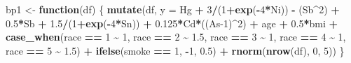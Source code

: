 \documentclass[12pt, twoside]{amherstthesis}
\newenvironment{Shaded}{\begin{snugshade}}{\end{snugshade}}
\newcommand{\AttributeTok}[1]{\textcolor[rgb]{0.13,0.29,0.53}{#1}}
\newcommand{\ControlFlowTok}[1]{\textcolor[rgb]{0.13,0.29,0.53}{\textbf{#1}}}
\newcommand{\DecValTok}[1]{\textcolor[rgb]{0.00,0.00,0.81}{#1}}
\newcommand{\FloatTok}[1]{\textcolor[rgb]{0.00,0.00,0.81}{#1}}
\newcommand{\FunctionTok}[1]{\textcolor[rgb]{0.13,0.29,0.53}{\textbf{#1}}}
\newcommand{\NormalTok}[1]{#1}
\newcommand{\OtherTok}[1]{\textcolor[rgb]{0.56,0.35,0.01}{#1}}
\newcommand{\SpecialCharTok}[1]{\textcolor[rgb]{0.81,0.36,0.00}{\textbf{#1}}}
\begin{document}
\begin{Shaded}
\begin{Highlighting}[]
\NormalTok{bp1 }\OtherTok{\textless{}{-}} \ControlFlowTok{function}\NormalTok{(df) \{}
  \FunctionTok{mutate}\NormalTok{(df, }\AttributeTok{y =} 
\NormalTok{           Hg }\SpecialCharTok{+} \DecValTok{3}\SpecialCharTok{/}\NormalTok{(}\DecValTok{1}\SpecialCharTok{+}\FunctionTok{exp}\NormalTok{(}\SpecialCharTok{{-}}\DecValTok{4}\SpecialCharTok{*}\NormalTok{Ni)) }\SpecialCharTok{{-}}\NormalTok{ (Sb}\SpecialCharTok{\^{}}\DecValTok{2}\NormalTok{) }\SpecialCharTok{+} \FloatTok{0.5}\SpecialCharTok{*}\NormalTok{Sb }\SpecialCharTok{+} \FloatTok{1.5}\SpecialCharTok{/}\NormalTok{(}\DecValTok{1}\SpecialCharTok{+}\FunctionTok{exp}\NormalTok{(}\SpecialCharTok{{-}}\DecValTok{4}\SpecialCharTok{*}\NormalTok{Sn)) }\SpecialCharTok{+} 
           \FloatTok{0.125}\SpecialCharTok{*}\NormalTok{Cd}\SpecialCharTok{*}\NormalTok{((As}\DecValTok{{-}1}\NormalTok{)}\SpecialCharTok{\^{}}\DecValTok{2}\NormalTok{) }\SpecialCharTok{+}
\NormalTok{           age }\SpecialCharTok{+} \FloatTok{0.5}\SpecialCharTok{*}\NormalTok{bmi }\SpecialCharTok{+} 
           \FunctionTok{case\_when}\NormalTok{(race }\SpecialCharTok{==} \DecValTok{1} \SpecialCharTok{\textasciitilde{}} \DecValTok{1}\NormalTok{, }
\NormalTok{                     race }\SpecialCharTok{==} \DecValTok{2} \SpecialCharTok{\textasciitilde{}} \FloatTok{1.5}\NormalTok{, }
\NormalTok{                     race }\SpecialCharTok{==} \DecValTok{3} \SpecialCharTok{\textasciitilde{}} \DecValTok{1}\NormalTok{, }
\NormalTok{                     race }\SpecialCharTok{==} \DecValTok{4} \SpecialCharTok{\textasciitilde{}} \DecValTok{1}\NormalTok{, }
\NormalTok{                     race }\SpecialCharTok{==} \DecValTok{5} \SpecialCharTok{\textasciitilde{}} \FloatTok{1.5}\NormalTok{) }\SpecialCharTok{+}
           \FunctionTok{ifelse}\NormalTok{(smoke }\SpecialCharTok{==} \DecValTok{1}\NormalTok{, }\SpecialCharTok{{-}}\DecValTok{1}\NormalTok{, }\FloatTok{0.5}\NormalTok{) }\SpecialCharTok{+}
           \FunctionTok{rnorm}\NormalTok{(}\FunctionTok{nrow}\NormalTok{(df), }\DecValTok{0}\NormalTok{, }\DecValTok{5}\NormalTok{))}
\NormalTok{\}}


\end{Highlighting}
\end{Shaded}
\end{document}
